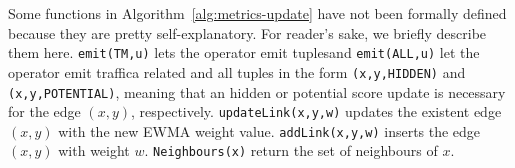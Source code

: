 Some functions in Algorithm~\ref{alg:metrics-update} have not been formally defined because they are pretty self-explanatory. For reader's sake, we briefly describe them here. \texttt{emit(TM,u)} lets the operator emit tuplesand \texttt{emit(ALL,u)} let the operator emit traffica related and all tuples in the form \texttt{(x,y,HIDDEN)} and \texttt{(x,y,POTENTIAL)}, meaning that an hidden or potential score update is necessary for the edge $(x,y)$, respectively.
\texttt{updateLink(x,y,w)} updates the existent edge $(x,y)$ with the new EWMA weight value. 
\texttt{addLink(x,y,w)} inserts the edge $(x,y)$ with weight $w$. 
\texttt{Neighbours(x)} return the set of neighbours of $x$.
